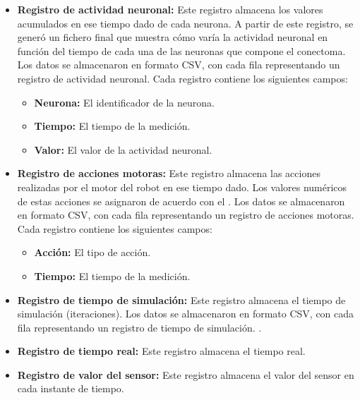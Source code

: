 \begin{itemize}
	\item \textbf{Registro de actividad neuronal: } Este registro almacena los valores acumulados en ese tiempo dado de cada neurona. A partir de este registro, se generó un fichero final que muestra cómo varía la actividad neuronal en función del tiempo de cada una de las neuronas que compone el conectoma. Los datos se almacenaron en formato CSV, con cada fila representando un registro de actividad neuronal. Cada registro contiene los siguientes campos:
	
	\begin{itemize}
\item  	\textbf{Neurona:} El identificador de la neurona.
\item  \textbf{Tiempo: } El tiempo de la medición.
\item \textbf{Valor: }El valor de la actividad neuronal.
	\end{itemize}
		
	\item \textbf{Registro de acciones motoras:} Este registro almacena las acciones realizadas por el motor del robot en ese tiempo dado. Los valores numéricos de estas acciones se asignaron de acuerdo con el  . Los datos se almacenaron en formato CSV, con cada fila representando un registro de acciones motoras. Cada registro contiene los siguientes campos:
	
\begin{itemize}
\item \textbf{	Acción:} El tipo de acción.
\item \textbf{Tiempo:} El tiempo de la medición.
\end{itemize}
	\item \textbf{Registro de tiempo de simulación:} Este registro almacena el tiempo de simulación (iteraciones). Los datos se almacenaron en formato CSV, con cada fila representando un registro de tiempo de simulación. .
	\item \textbf{Registro de tiempo real:} Este registro almacena el tiempo real.
	\item \textbf{Registro de valor del sensor:} Este registro almacena el valor del sensor en cada instante de tiempo.
\end{itemize}

